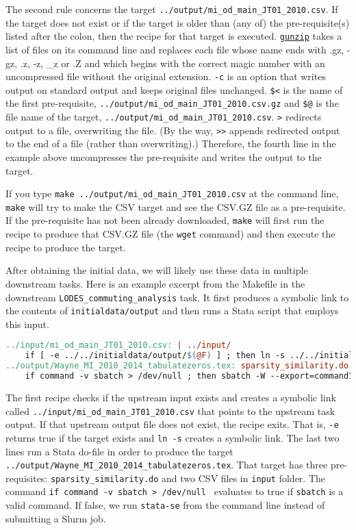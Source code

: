 The second rule concerns the target \texttt{../output/mi\_od\_main\_JT01\_2010.csv}.
If the target  does not exist or if the target is older than (any of) the pre-requisite(s) listed after the colon,
then the recipe for that target is executed.
\href{https://linux.die.net/man/1/gunzip}{\texttt{gunzip}} takes a list of files on its command line and replaces each file whose name ends with .gz, -gz, .z, -z, \_z or .Z and which begins with the correct magic number with an uncompressed file without the original extension.
\texttt{-c} is an option that writes output on standard output and keeps original files unchanged.
\texttt{\$<} is the name of the first pre-requisite, \texttt{../output/mi\_od\_main\_JT01\_2010.csv.gz} and \texttt{\$@} is the file name of the target, \texttt{../output/mi\_od\_main\_JT01\_2010.csv}.
\texttt{>} redirects output to a file, overwriting the file.
(By the way, \texttt{>>} appends redirected output to the end of a file (rather than overwriting).)
Therefore, the fourth line in the example above uncompresses the pre-requisite and writes the output to the target.

If you type \texttt{make ../output/mi\_od\_main\_JT01\_2010.csv} at the command line, \texttt{make} will try to make the CSV target and see the CSV.GZ file as a pre-requisite.
If the pre-requisite has not been already downloaded, \texttt{make} will first run the recipe to produce that CSV.GZ file (the \texttt{wget} command) and then execute the recipe to produce the target.

After obtaining the initial data, we will likely use these data in multiple downstream tasks.
Here is an example excerpt from the Makefile in the downstream \texttt{LODES\_commuting\_analysis} task.
It first produces a symbolic link to the contents of \texttt{initialdata/output}
and then runs a Stata script that employs this input.
\begin{lstlisting}[language=make]
../input/mi_od_main_JT01_2010.csv: | ../input/
	if [ -e ../../initialdata/output/$(@F) ] ; then ln -s ../../initialdata/output/$(@F) $@ ; else exit 1; fi
../output/Wayne_MI_2010_2014_tabulatezeros.tex: sparsity_similarity.do ../input/mi_od_main_JT01_2010.csv ../input/mi_od_main_JT01_2014.csv
	if command -v sbatch > /dev/null ; then sbatch -W --export=command1='module load stata',command2='stata-se -e sparsity_similarity.do' run.sbatch; else stata-se -e sparsity_similarity.do; fi
\end{lstlisting}
The first recipe checks if the upstream input exists and creates a symbolic link called \texttt{../input/mi\_od\_main\_JT01\_2010.csv} that points to the upstream task output.
If that upstream output file does not exist, the recipe exits.
That is, \texttt{-e} returns true if the target exists and \texttt{ln -s} creates a symbolic link.
The last two lines run a Stata do-file in order to produce the target \texttt{../output/Wayne\_MI\_2010\_2014\_tabulatezeros.tex}.
That target has three pre-requisites: \texttt{sparsity\_similarity.do} and two CSV files in \texttt{input} folder.
The command \texttt{if command -v sbatch > /dev/null } evaluates to true if \texttt{sbatch} is a valid command.
If false, we run \texttt{stata-se} from the command line instead of submitting a Slurm job.
